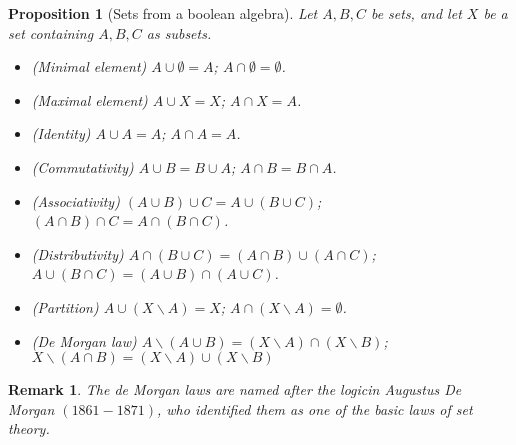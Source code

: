 \documentclass[a4paper,oneside]{book}
\newtheorem{remark}{Remark}[section]
\newtheorem{proposition}{Proposition}[section]
\begin{document}
			\begin{proposition}[Sets from a boolean algebra]
				Let $A,B,C$ be sets, and let $X$ be a set containing $A,B,C$ as subsets.
				\begin{itemize}
					\item[$(a)$] (Minimal element) $A\cup \emptyset=A$; $A\cap \emptyset=\emptyset$.
					\item[$(b)$] (Maximal element) $A\cup X=X$; $A\cap X=A$.
					\item[$(c)$] (Identity) $A\cup A=A$; $A\cap A=A$.
					\item[$(d)$] (Commutativity) $A\cup B=B\cup A$; $A\cap B=B\cap A$.
					\item[$(e)$] (Associativity) $(A\cup B)\cup C=A\cup(B\cup C)$; $(A\cap B)\cap C=A\cap(B\cap C)$.
					\item[$(f)$] (Distributivity) $A\cap(B\cup C)=(A\cap B)\cup(A\cap C)$; $A\cup(B\cap C)=(A\cup B)\cap(A\cup C)$.
					\item[$(g)$] (Partition) $A\cup(X\backslash A)=X$; $A\cap(X\backslash A)=\emptyset$.
					\item[$(h)$] (De Morgan law) $A\backslash(A\cup B)=(X\backslash A)\cap(X\backslash B)$; $X\backslash(A\cap B)=(X\backslash A)\cup(X\backslash B)$
				\end{itemize}
			\end{proposition}
			\begin{remark}
				The de Morgan laws are named after the logicin Augustus De Morgan $(1861-1871)$, who identified them as one of the basic laws of set theory.
			\end{remark}
\end{document}
